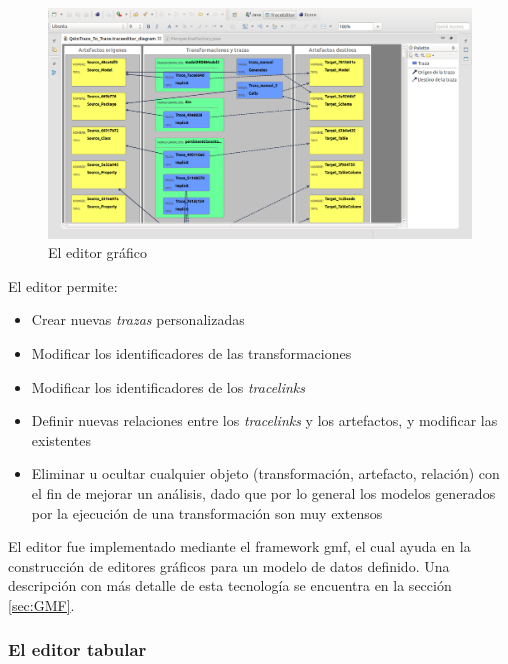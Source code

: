 \documentclass[a4paper,12pt,twoside,spanish,openright]{book}
\begin{document}
\begin{figure}[hbtp]
\centering
\includegraphics[scale=.29]{./img/TraceEditorGrafico}
\caption{El editor gráfico}
\label{fig:TraceEditorGrafico}
\end{figure}


El editor permite:

\begin{itemize}
\item Crear nuevas \textit{trazas} personalizadas
\item Modificar los identificadores de las transformaciones
\item Modificar los identificadores de los \textit{tracelinks}
\item Definir nuevas relaciones entre los \textit{tracelinks} y los artefactos, y modificar las existentes 
\item Eliminar u ocultar cualquier objeto (transformación, artefacto, relación) con el fin de mejorar un análisis, dado que por lo general los modelos generados por la ejecución de una transformación son muy extensos
\end{itemize}


El editor fue implementado mediante el framework \gls{gmf}, el cual ayuda en la construcción de editores gráficos para un modelo de datos definido. Una descripción con más detalle de esta tecnología se encuentra en la sección \ref{sec:GMF}.


\subsubsection{El editor tabular}
\label{subsubsec:EditorTabular}
\end{document}

